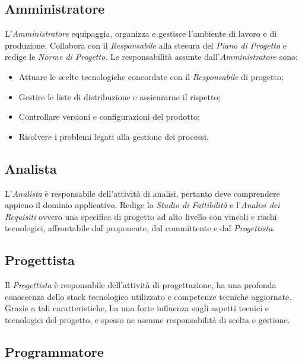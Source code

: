 	\subsection{Amministratore}
	
	L'\textit{Amministratore} equipaggia, organizza e gestisce l'ambiente di lavoro e di produzione. Collabora con il \textit{Responsabile} alla stesura del \textit{Piano di Progetto} e redige le \textit{Norme di Progetto}.
	Le responsabilità assunte dall'\textit{Amministratore} sono:

	\begin{itemize}

		\item Attuare le scelte tecnologiche concordate con il \textit{Responsabile} di progetto;
		\item Gestire le liste di distribuzione e assicurarne il rispetto;
		\item Controllare versioni e configurazioni del prodotto;
		\item Risolvere i problemi legati alla gestione dei processi.

	\end{itemize}

	\subsection{Analista}

	L'\textit{Analista} è responsabile dell'attività di analisi, pertanto deve comprendere appieno il dominio applicativo. Redige lo \textit{Studio di Fattibilità} e l'\textit{Analisi dei Requisiti} ovvero una specifica di progetto ad alto livello con vincoli e rischi tecnologici, affrontabile dal proponente, dal committente e dal \textit{Progettista}.


	\subsection{Progettista}

	Il \textit{Progettista} è responsabile dell'attività di progettazione, ha una profonda conoscenza dello stack tecnologico utilizzato e competenze tecniche aggiornate. Grazie a tali caratteristiche, ha una forte influenza sugli aspetti tecnici e tecnologici del progetto, e spesso ne assume responsabilità di scelta e gestione.


	\subsection{Programmatore}

